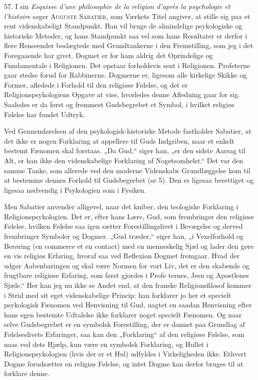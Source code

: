 \documentclass[12pt,a4paper,openany]{book}
\newcommand{\opage}[1]{\marginnote{\footnotesize\textit{[#1]}}}
\begin{document}
57. I sin \textit{Esquisse d’une philosophie de la religion d’après la
psychologie et l’histoire} søger \textsc{Auguste Sabatier}, som Værkets
Titel angiver, at stille sig paa et rent videnskabeligt Standpunkt. Han
vil bruge de almindelige psykologiske og historiske Metoder, og hans
Standpunkt saa vel som hans Resultater er derfor i flere Henseender
beslægtede med Grundtankerne i den Fremstilling, som jeg i det
Foregaaende har givet. Dogmet er for ham aldrig det Oprindelige og
Fundamentale i Religionen. Det opstaar forholdsvis sent i Religionen.
Profeterne gaar stedse forud for Rabbinerne. Dogmerne er, ligesom alle
kirkelige Skikke og Former, afledede i Forhold til den religiøse
Følelse, og det er Religionspsykologiens Opgave at vise, hvorledes denne
Afledning gaar for sig. Saaledes er da først og fremmest Gudsbegrebet et
Symbol, i hvilket religiøs Følelse har fundet Udtryk.

Ved Gennemførelsen af den psykologisk-historiske Metode fastholder
Sabatier, at det ikke er nogen Forklaring at appellere til Guds
Indgriben, naar et enkelt bestemt Fænomen skal forstaas. „Da Gud,“ siger
han, „er den sidste Aarsag til Alt, er han ikke den videnskabelige
Forklaring af Nogetsomhelst.“ Det var den samme Tanke, som allerede ved
den moderne Videnskabs Grundlæggelse kom til at bestemme dennes Forhold
til Gudsbegrebet (se 5). Den er ligesaa berettiget og ligesaa nødvendig
i Psykologien som i Fysiken.

Men Sabatier anvender alligevel, naar det kniber, den teologiske
Forklaring i Religionspsykologien. Det er, efter hans Lære, Gud, som
frembringer den religiøse Følelse, hvilken Følelse saa igen sætter
Forestillingslivet i Bevægelse og derved frembringer Symboler og Dogmer.
„Gud træder,“ siger han, „i Vexelforhold og Berøring (en commerce et en
contact) med en menneskelig Sjæl og lader den gøre en vis religiøs
Erfaring, hvoraf saa ved Reflexion Dogmet fremgaar. Hvad der udgør
Aabenbaringen og skal være Normen for vort Liv, det er den skabende og
frugtbare religiøse Erfaring, som først gjordes i Profe%
\opage{128}ternes, Jesu og Apostlenes Sjæle.“ Her kan jeg nu ikke se
Andet end, at den franske Religionsfilosof kommer i Strid med sit eget
videnskabelige Princip: han forklarer jo her et specielt psykologisk
Fænomen ved Henvisning til Gud, uagtet en saadan Henvisning efter hans
egen bestemte Udtalelse ikke forklarer noget specielt Fænomen. Og naar
selve Gudsbegrebet er en symbolsk Forestilling, der er dannet paa
Grundlag af Følelseslivets Erfaringer, saa kan den „Forklaring“ af den
religiøse Følelse, som naas ved dets Hjælp, kun være en symbolsk
Forklaring, og Hullet i Religionspsykologien (hvis der er et Hul)
udfyldes i Virkeligheden ikke. Ethvert Dogme forudsætter en religiøs
Følelse, og intet Dogme kan derfor bruges til at forklare denne.
\end{document}
